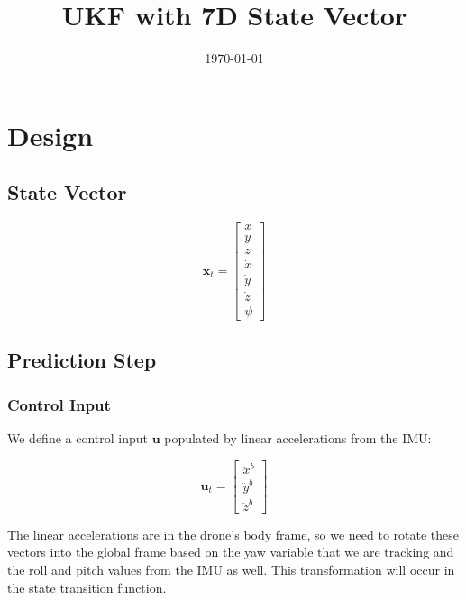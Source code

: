 \documentclass{article}
\title{UKF with 7D State Vector}
\author{}
\date{\today}
\begin{document}
\maketitle

\section{Design}

\subsection{State Vector}

\begin{equation}
\mathbf{x}_t = \begin{bmatrix}
x \\
y \\
z \\
\dot x \\
\dot y \\
\dot z \\
\psi \end{bmatrix}
\end{equation}

\subsection{Prediction Step}

\subsubsection{Control Input}

We define a control input $\mathbf{u}$ populated by linear accelerations from the IMU:

\begin{equation}
\mathbf{u}_t = \begin{bmatrix}
\ddot x^b \\
\ddot y^b \\
\ddot z^b
\end{bmatrix}
\end{equation}

The linear accelerations are in the drone's body frame, so we need to rotate these vectors into the global frame based on the yaw variable that we are tracking and the roll and pitch values from the IMU as well. This transformation will occur in the state transition function.
\end{document}
